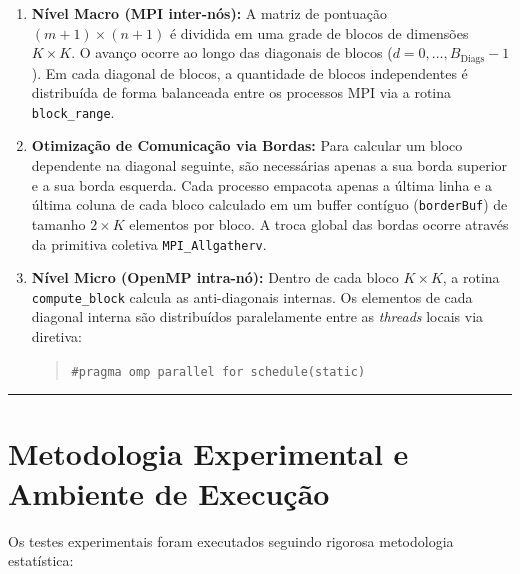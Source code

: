 \documentclass[12pt,a4paper]{article}
\begin{document}
\begin{enumerate}
    \item \textbf{Nível Macro (MPI inter-nós):} A matriz de pontuação $(m+1) \times (n+1)$ é dividida em uma grade de blocos de dimensões $K \times K$. O avanço ocorre ao longo das diagonais de blocos ($d = 0, \dots, B_{\text{Diags}}-1$). Em cada diagonal de blocos, a quantidade de blocos independentes é distribuída de forma balanceada entre os processos MPI via a rotina \texttt{block\_range}.
    \item \textbf{Otimização de Comunicação via Bordas:} Para calcular um bloco dependente na diagonal seguinte, são necessárias apenas a sua borda superior e a sua borda esquerda. Cada processo empacota apenas a última linha e a última coluna de cada bloco calculado em um buffer contíguo (\texttt{borderBuf}) de tamanho $2 \times K$ elementos por bloco. A troca global das bordas ocorre através da primitiva coletiva \texttt{MPI\_Allgatherv}.
    \item \textbf{Nível Micro (OpenMP intra-nó):} Dentro de cada bloco $K \times K$, a rotina \texttt{compute\_block} calcula as anti-diagonais internas. Os elementos de cada diagonal interna são distribuídos paralelamente entre as \textit{threads} locais via diretiva:
    \begin{quote}
        \texttt{\#pragma omp parallel for schedule(static)}
    \end{quote}
\end{enumerate}

\vspace{0.5cm}
\hrule
\vspace{0.5cm}

\section{Metodologia Experimental e Ambiente de Execução}

Os testes experimentais foram executados seguindo rigorosa metodologia estatística:
\end{document}
